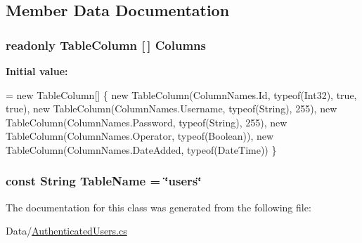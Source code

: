 \subsection{Member Data Documentation}
\hypertarget{classOTA_1_1Data_1_1AuthenticatedUsers_1_1UserTable_afdedc9f90d9d4e7d2727bf6d101733bf}{}
\subsubsection[{Columns}]{\setlength{\rightskip}{0pt plus 5cm}readonly {\bf Table\+Column} \mbox{[}$\,$\mbox{]} Columns\hspace{0.3cm}{\ttfamily [static]}}\label{classOTA_1_1Data_1_1AuthenticatedUsers_1_1UserTable_afdedc9f90d9d4e7d2727bf6d101733bf}
{\bfseries Initial value\+:}
\begin{DoxyCode}
= \textcolor{keyword}{new} TableColumn[]
            \{
                \textcolor{keyword}{new} TableColumn(ColumnNames.Id, typeof(Int32), \textcolor{keyword}{true}, \textcolor{keyword}{true}),
                \textcolor{keyword}{new} TableColumn(ColumnNames.Username, typeof(String), 255),
                \textcolor{keyword}{new} TableColumn(ColumnNames.Password, typeof(String), 255),
                \textcolor{keyword}{new} TableColumn(ColumnNames.Operator, typeof(Boolean)),
                \textcolor{keyword}{new} TableColumn(ColumnNames.DateAdded, typeof(DateTime))
            \}
\end{DoxyCode}
\hypertarget{classOTA_1_1Data_1_1AuthenticatedUsers_1_1UserTable_a031b487979d7f51a4d54951b8fedebee}{}
\subsubsection[{Table\+Name}]{\setlength{\rightskip}{0pt plus 5cm}const String Table\+Name = \char`\"{}users\char`\"{}}\label{classOTA_1_1Data_1_1AuthenticatedUsers_1_1UserTable_a031b487979d7f51a4d54951b8fedebee}


The documentation for this class was generated from the following file\+:\begin{DoxyCompactItemize}
\item 
Data/\hyperlink{AuthenticatedUsers_8cs}{Authenticated\+Users.\+cs}\end{DoxyCompactItemize}
